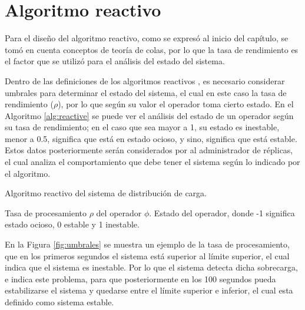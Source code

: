\section{Algoritmo reactivo}
Para el diseño del algoritmo reactivo, como se expresó al inicio del capítulo, se tomó en cuenta conceptos de teoría de colas, por lo que la tasa de rendimiento es el factor que se utilizó para el análisis del estado del sistema.

Dentro de las definiciones de los algoritmos reactivos \citep{CasavantK88}, es necesario considerar umbrales para determinar el estado del sistema, el cual en este caso la tasa de rendimiento ($\rho$), por lo que según su valor el operador toma cierto estado. En el Algoritmo \ref{alg:reactive} se puede ver el análisis del estado de un operador según su tasa de rendimiento; en el caso que sea mayor a 1, su estado es inestable, menor a 0.5, significa que está en estado ocioso, y sino, significa que está estable. Estos datos posteriormente serán considerados por al administrador de réplicas, el cual analiza el comportamiento que debe tener el sistema según lo indicado por el algoritmo.

\begin{algorithm}[!ht]
	\caption{Algoritmo reactivo del sistema de distribución de carga.}
	\label{alg:reactive}
	\begin{algorithmic}[1]
	\REQUIRE Tasa de procesamiento $\rho$ del operador $\phi$.
	\ENSURE Estado del operador, donde -1 significa estado ocioso, 0 estable y 1 inestable.
	\ELSE
	\ENDIF
	\end{algorithmic}
\end{algorithm}

En la Figura \ref{fig:umbrales} se muestra un ejemplo de la tasa de procesamiento, que en los primeros segundos el sistema está superior al límite superior, el cual indica que el sistema es inestable. Por lo que el sistema detecta dicha sobrecarga, e indica este problema, para que posteriormente en los 100 segundos pueda estabilizarse el sistema y quedarse entre el límite superior e inferior, el cual esta definido como sistema estable.

